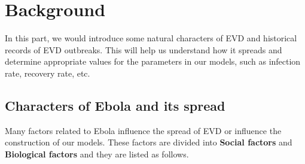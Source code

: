 \section{Background}
In this part, we would introduce some natural characters of EVD and historical records of EVD outbreaks. This will help us understand how it spreads and determine appropriate values for the parameters in our models, such as infection rate, recovery rate, etc.

\subsection{Characters of Ebola and its spread}

\par Many factors related to Ebola influence the spread of EVD or influence the construction of our models. These factors are divided into \textbf{Social factors} and \textbf{Biological factors} and they are listed as follows.

